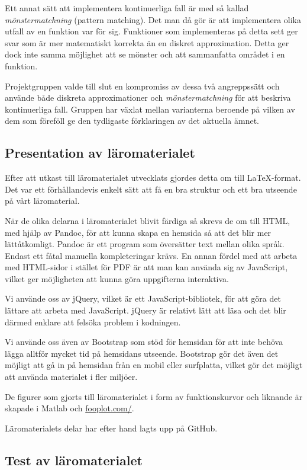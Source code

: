 \documentclass[12pt,a4paper,twoside,openright]{article}
\begin{document}
Ett annat sätt att implementera kontinuerliga fall är med så kallad
\textit{mönstermatchning} (pattern matching). Det man då gör är att
implementera olika utfall av en funktion var för sig. Funktioner som
implementeras på detta sett ger svar som är mer matematiskt korrekta
än en diskret approximation. Detta ger dock inte samma möjlighet att
se mönster och att sammanfatta området i en funktion.

Projektgruppen valde till slut en kompromiss av dessa två angreppssätt
och använde både diskreta approximationer och
\textit{mönstermatchning} för att beskriva kontinuerliga fall. Gruppen
har växlat mellan varianterna beroende på vilken av dem som föreföll
ge den tydligaste förklaringen av det aktuella ämnet.

\subsection{Presentation av läromaterialet}
Efter att utkast till läromaterialet utvecklats gjordes detta om till
LaTeX-format. Det var ett förhållandevis enkelt sätt att få en bra
struktur och ett bra utseende på vårt läromaterial.

När de olika delarna i läromaterialet blivit färdiga så skrevs de om
till HTML, med hjälp av Pandoc, för att kunna skapa en hemsida så att
det blir mer lätt\-åtkomligt. Pandoc är ett program som översätter
text mellan olika språk. Endast ett fåtal manuella kompleteringar
krävs.  En annan fördel med att arbeta med HTML-sidor i stället för
PDF är att man kan använda sig av JavaScript, vilket ger möjligheten
att kunna göra uppgifterna interaktiva.

Vi använde oss av jQuery, vilket är ett JavaScript-bibliotek, för att
göra det lättare att arbeta med JavaScript. jQuery är relativt lätt
att läsa och det blir därmed enklare att felsöka problem i kodningen.

Vi använde oss även av Bootstrap som stöd för hemsidan för att inte
behöva lägga alltför mycket tid på hemsidans utseende. Bootstrap gör
det även det möjligt att gå in på hemsidan från en mobil eller
surfplatta, vilket gör det möjligt att använda materialet i fler
miljöer.

De figurer som gjorts till läromaterialet i form av funktionskurvor
och liknande är skapade i Matlab och \url{fooplot.com/}.

Läromaterialets delar har efter hand lagts upp på GitHub.

\subsection{Test av läromaterialet}
\label{sec:test}
\end{document}

